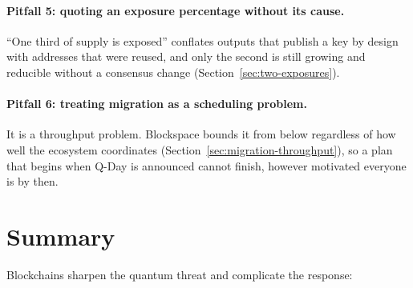 \paragraph{Pitfall 5: quoting an exposure percentage without its cause.}
``One third of supply is exposed'' conflates outputs that publish a key by design
with addresses that were reused, and only the second is still growing and
reducible without a consensus change (Section~\ref{sec:two-exposures}).

\paragraph{Pitfall 6: treating migration as a scheduling problem.}
It is a throughput problem. Blockspace bounds it from below regardless of how
well the ecosystem coordinates (Section~\ref{sec:migration-throughput}), so a
plan that begins when Q-Day is announced cannot finish, however motivated
everyone is by then.

\section{Summary}
Blockchains sharpen the quantum threat and complicate the response:

